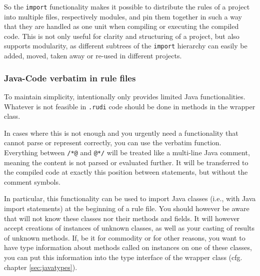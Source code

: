 So the \texttt{import} functionality makes it possible to distribute the rules of a project into multiple files, respectively modules, and pin them together in such a way that they are handled as one unit when compiling or executing the compiled code. This is not only useful for clarity and structuring of a project, but also supports modularity, as different subtrees of the \texttt{import} hierarchy can easily be added, moved, taken away or re-used in different projects.

\subsubsection{Java-Code verbatim in rule files} \label{sec:rudi-verbatim}

%
To maintain simplicity, \vonda intentionally only provides limited Java functionalities. Whatever is not feasible in \texttt{.rudi} code should be done in methods in the wrapper class.%

%
In cases where this is not enough and you urgently need a functionality %
that \vonda cannot parse or represent correctly, you can use the verbatim function. Everything between \verb|/*@| and \verb|@*/| will be treated like a multi-line Java comment, meaning the content is not parsed or evaluated further. It will be transferred to the compiled code at exactly this position between statements, but without the comment symbols.


In particular, this functionality can be used to import Java classes (i.e., with Java import statements) at the beginning of a rule file. You should however be aware that \vonda will not know these classes nor their methods and fields. It will however accept creations of instances of unknown classes, as well as your casting of results of unknown methods. If, be it for commodity or for other reasons, you want \vonda to have type information about methods called on instances on one of these classes, you can put this information into the type interface of the wrapper class (cfg. chapter \ref{sec:javatypes}).

